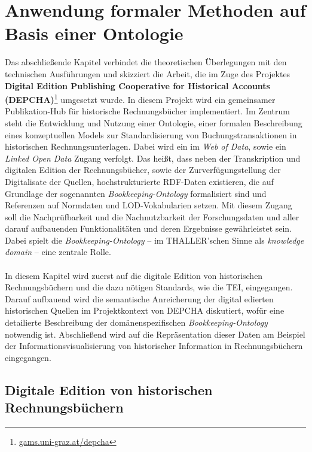 \documentclass[12pt,a4paper]{article}
\begin{document}
\newpage
\section{Anwendung formaler Methoden auf Basis einer Ontologie}
\label{Umsetzung}

Das abschließende Kapitel verbindet die theoretischen Überlegungen mit den technischen Ausführungen und skizziert die Arbeit, die im Zuge des Projektes \textbf{Digital Edition Publishing Cooperative for Historical Accounts (DEPCHA)}\footnote{\url{gams.uni-graz.at/depcha}} umgesetzt wurde. In diesem Projekt wird ein gemeinsamer Publikation-Hub für historische Rechnungsbücher implementiert. Im Zentrum steht die Entwicklung und Nutzung einer Ontologie, einer formalen Beschreibung eines konzeptuellen Models zur Standardisierung von Buchungstransaktionen in historischen Rechnungsunterlagen. Dabei wird ein im \textit{Web of Data}, sowie ein \textit{Linked Open Data} Zugang verfolgt. Das heißt, dass neben der Transkription und digitalen Edition der Rechnungsbücher, sowie der Zurverfügungstellung der Digitalisate der Quellen, hochstrukturierte RDF-Daten existieren, die auf Grundlage der sogenannten \textit{Bookkeeping-Ontology} formalisiert sind und Referenzen auf Normdaten und LOD-Vokabularien setzen. Mit diesem Zugang soll die Nachprüfbarkeit und die Nachnutzbarkeit der Forschungsdaten und aller darauf aufbauenden Funktionalitäten und deren Ergebnisse gewährleistet sein. Dabei spielt die \textit{Bookkeeping-Ontology} -- im THALLER'schen Sinne als \textit{knowledge domain} -- eine zentrale Rolle.
\\
\\
In diesem Kapitel wird zuerst auf die digitale Edition von historischen Rechnungsbüchern und die dazu nötigen Standards, wie die TEI, eingegangen. Darauf aufbauend wird die semantische Anreicherung der digital edierten historischen Quellen im Projektkontext von DEPCHA diskutiert, wofür eine detailierte Beschreibung der domänenspezifischen \textit{Bookkeeping-Ontology} notwendig ist. Abschließend wird auf die Repräsentation dieser Daten am Beispiel der Informationsvisualisierung von historischer Information in Rechnungsbüchern eingegangen.

\subsection{Digitale Edition von historischen Rechnungsbüchern}
\end{document}

